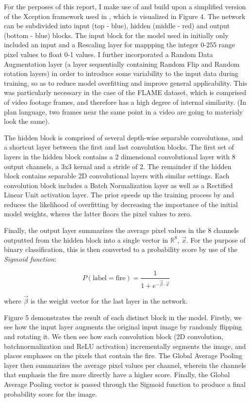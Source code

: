 \documentclass[a4paper,11pt]{article} %
\begin{document}
For the perposes of this report, I make use of and build upon a simplified version of the Xception framework used in \cite{FLAME_dataset}, which is visualized
in Figure 4. The network can be subdivided into input (top - blue), hidden (middle - red) and output (bottom - blue) blocks. The input block for the model used in \cite{FLAME_dataset}
initially only included an input and a Rescaling layer for mappping the integer 0-255 range pixel values to float 0-1 values. I further incorporated a Random Data Augmentation
layer (a layer sequentially containing Random Flip and Random rotation layers) in order to introduce some variability to the input data during training, so as to reduce model overfitting
and improve general applicability. This was particularly necessary in the case of the FLAME dataset, which is comprised of video footage frames, and therefore has a high degree of internal similarity.
(In plan language, two frames near the same point in a video are going to materialy look the same).

\medskip

The hidden block is comprised of several depth-wise separable convolutions, and a shortcut layer between the first and last convolution blocks. The first set of layers in the hidden block
contains a 2 dimensional convolutional layer with 8 output channels, a 3x3 kernal and a stride of 2. The remainder if the hidden block contains separable 2D convolutional layers with similar settings.
Each convolution block includes a Batch Normalization layer as well as a Rectified Linear Unit activation layer. The prior speeds up the training process by and reduces the likelihood of overfitting by
decreasing the importance of the initial model weights, wheres the latter floors the pixel values to zero.

\medskip

Finally, the output layer summarizes the average pixel values in the 8 channels outputted from the hidden block into a single vector in $\mathbb{R}^8$, $\vec{x}$. For the purpose of binary classification,
this is then converted to a probability score by use of the \emph{Sigmoid function}:

\[
    P(\text{label}=\text{fire}) = \frac{1}{1 + e^{-\vec{\beta} \cdot \vec{x}}}
\] 

where $\vec{\beta}$ is the weight vector for the last layer in the network. 

Figure 5 demonstrates the result of each distinct block in the model. Firstly, 
we see how the input layer augments the original input image by randomly flipping and rotating
it. We then see how each convolution block (2D convolution, batchnormalization and ReLU activation)
incrementally segments the image, and places emphases on the pixels that contain the fire. The Global
Average Pooling layer then summarizes the average pixel values per channel, wherein the
channels that emphasis the fire more directly have a higher score. Finally, the Global Average
Pooling vector is passed through the Sigmoid function to produce a final probability score for the
image.
\end{document}
